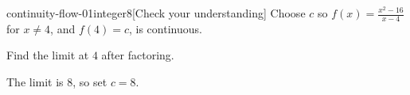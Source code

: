 \begin{bgcheck}{continuity-flow-01}{integer}{8}[Check your understanding]
Choose \(c\) so \(f(x)=\frac{x^2-16}{x-4}\) for \(x\ne4\), and \(f(4)=c\), is continuous.
\begin{bghint}
Find the limit at \(4\) after factoring.
\end{bghint}
\begin{bgreveal}
The limit is \(8\), so set \(c=8\).
\end{bgreveal}
\end{bgcheck}
